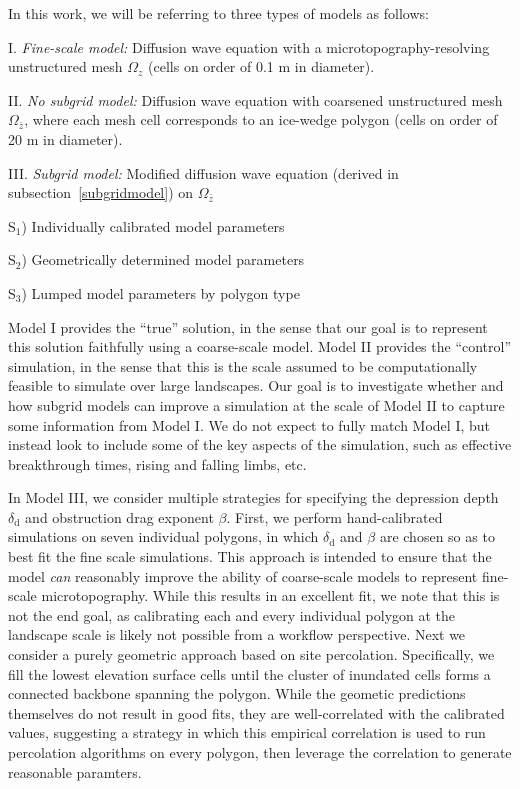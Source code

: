 In this work, we will be referring to three types of models as follows:
%
\begin{description}\itemsep0pt \parskip0pt
\item I. \emph{Fine-scale model:} Diffusion wave equation with a microtopography-resolving unstructured mesh $\Omega_z$ (cells on order of 0.1 m in diameter). 
\item II. \emph{No subgrid model:} Diffusion wave equation with coarsened unstructured mesh $\Omega_{\bar{z}}$, where each mesh cell corresponds to an ice-wedge polygon (cells on order of 20 m in diameter).
\item III. \emph{Subgrid model:} Modified diffusion wave equation (derived in subsection~\ref{subgridmodel}) on $\Omega_{\bar{z}}$
  \begin{description}
  \item S$_1$) Individually calibrated model parameters
  \item S$_2$) Geometrically determined model parameters
  \item S$_3$) Lumped model parameters by polygon type
  \end{description}
\end{description}
%
Model I provides the ``true'' solution, in the sense that our goal is to represent this solution faithfully using a coarse-scale model.
Model II provides the ``control'' simulation, in the sense that this is the scale assumed to be computationally feasible to simulate over large landscapes.
Our goal is to investigate whether and how subgrid models can improve a simulation at the scale of Model II to capture some information from Model I.
We do not expect to fully match Model I, but instead look to include some of the key aspects of the simulation, such as effective breakthrough times, rising and falling limbs, etc.

In Model III, we consider multiple strategies for specifying the depression depth $\delta_\text{d}$ and obstruction drag exponent $\beta$.
First, we perform hand-calibrated simulations on seven individual polygons, in which $\delta_\text{d}$ and $\beta$ are chosen so as to best fit the fine scale simulations.
This approach is intended to ensure that the model \emph{can} reasonably improve the ability of coarse-scale models to represent fine-scale microtopography.
While this results in an excellent fit, we note that this is not the end goal, as calibrating each and every individual polygon at the landscape scale is likely not possible from a workflow perspective.
Next we consider a purely geometric approach based on site percolation.
Specifically, we fill the lowest elevation surface cells until the cluster of inundated cells forms a connected backbone spanning the polygon.
While the geometic predictions themselves do not result in good fits, they are well-correlated with the calibrated values, suggesting a strategy in which this empirical correlation is used to run percolation algorithms on every polygon, then leverage the correlation to generate reasonable paramters.

